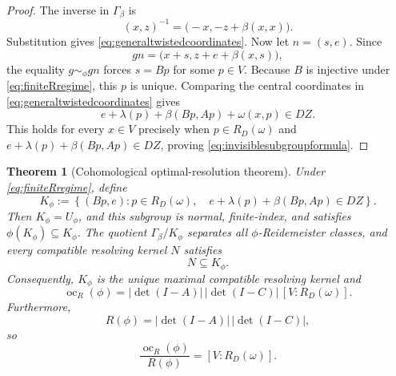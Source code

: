 \documentclass[11pt]{article}
\newtheorem{theorem}{Theorem}[section]
\DeclareMathOperator{\oc}{oc}
\begin{document}
\begin{proof}
The inverse in $\Gamma_\beta$ is
\[
  (x,z)^{-1}=\bigl(-x,-z+\beta(x,x)\bigr).
\]
Substitution gives \eqref{eq:generaltwistedcoordinates}.  Now let
$n=(s,e)$.  Since
\[
  gn=\bigl(x+s,z+e+\beta(x,s)\bigr),
\]
the equality $g\sim_\phi gn$ forces $s=Bp$ for some $p\in V$.  Because
$B$ is injective under \eqref{eq:finiteRregime}, this $p$ is unique.  Comparing
the central coordinates in \eqref{eq:generaltwistedcoordinates} gives
\[
  e+\lambda(p)+\beta(Bp,Ap)+\omega(x,p)\in DZ.
\]
This holds for every $x\in V$ precisely when $p\in R_D(\omega)$ and
$e+\lambda(p)+\beta(Bp,Ap)\in DZ$, proving
\eqref{eq:invisiblesubgroupformula}.
\end{proof}

\begin{theorem}[Cohomological optimal-resolution theorem]
\label{thm:cohomologicalresolution}
Under \eqref{eq:finiteRregime}, define
\begin{equation}
  K_\phi
  :=\left\{
  (Bp,e):
  p\in R_D(\omega),\quad
  e+\lambda(p)+\beta(Bp,Ap)\in DZ
  \right\}.
  \label{eq:maximalresolvingkernel}
\end{equation}
Then $K_\phi=U_\phi$, and this subgroup is normal, finite-index, and satisfies
$\phi(K_\phi)\subseteq K_\phi$.  The quotient
$\Gamma_\beta/K_\phi$ separates all $\phi$-Reidemeister classes, and every
compatible resolving kernel $N$ satisfies
\[
  N\subseteq K_\phi.
\]
Consequently, $K_\phi$ is the unique maximal compatible resolving kernel and
\begin{equation}
  \boxed{
  \oc_R(\phi)
  =|\det(I-A)|\,|\det(I-C)|\,[V:R_D(\omega)].}
  \label{eq:cohomologicalocformula}
\end{equation}
Furthermore,
\begin{equation}
  R(\phi)=|\det(I-A)|\,|\det(I-C)|,
  \label{eq:centralextensionR}
\end{equation}
so
\begin{equation}
  \boxed{
  \frac{\oc_R(\phi)}{R(\phi)}=[V:R_D(\omega)].}
  \label{eq:cohomologicalpenalty}
\end{equation}
\end{theorem}
\end{document}
